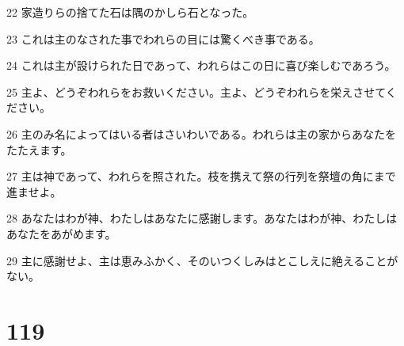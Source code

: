 \par 22 家造りらの捨てた石は隅のかしら石となった。
\par 23 これは主のなされた事でわれらの目には驚くべき事である。
\par 24 これは主が設けられた日であって、われらはこの日に喜び楽しむであろう。
\par 25 主よ、どうぞわれらをお救いください。主よ、どうぞわれらを栄えさせてください。
\par 26 主のみ名によってはいる者はさいわいである。われらは主の家からあなたをたたえます。
\par 27 主は神であって、われらを照された。枝を携えて祭の行列を祭壇の角にまで進ませよ。
\par 28 あなたはわが神、わたしはあなたに感謝します。あなたはわが神、わたしはあなたをあがめます。
\par 29 主に感謝せよ、主は恵みふかく、そのいつくしみはとこしえに絶えることがない。

\chapter{119}

